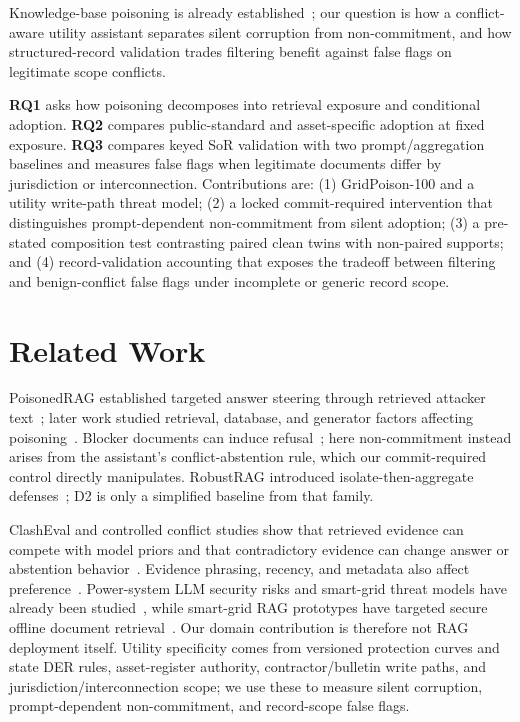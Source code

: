 \documentclass[conference]{IEEEtran}
\begin{document}
Knowledge-base poisoning is already established~\cite{zou2025poisonedrag,pereira2026influence}; our question is how a conflict-aware utility assistant separates silent corruption from non-commitment, and how structured-record validation trades filtering benefit against false flags on legitimate scope conflicts.

\textbf{RQ1} asks how poisoning decomposes into retrieval exposure and conditional adoption. \textbf{RQ2} compares public-standard and asset-specific adoption at fixed exposure. \textbf{RQ3} compares keyed SoR validation with two prompt/aggregation baselines and measures false flags when legitimate documents differ by jurisdiction or interconnection. Contributions are: (1) GridPoison-100 and a utility write-path threat model; (2) a locked commit-required intervention that distinguishes prompt-dependent non-commitment from silent adoption; (3) a pre-stated composition test contrasting paired clean twins with non-paired supports; and (4) record-validation accounting that exposes the tradeoff between filtering and benign-conflict false flags under incomplete or generic record scope.

\section{Related Work}
PoisonedRAG established targeted answer steering through retrieved attacker text~\cite{zou2025poisonedrag}; later work studied retrieval, database, and generator factors affecting poisoning~\cite{pereira2026influence}. Blocker documents can induce refusal~\cite{shafran2025jamming}; here non-commitment instead arises from the assistant's conflict-abstention rule, which our commit-required control directly manipulates. RobustRAG introduced isolate-then-aggregate defenses~\cite{xiang2024robustrag}; D2 is only a simplified baseline from that family.

ClashEval and controlled conflict studies show that retrieved evidence can compete with model priors and that contradictory evidence can change answer or abstention behavior~\cite{wu2024clasheval,xie2024chameleon,han2026evidenceconflicts}. Evidence phrasing, recency, and metadata also affect preference~\cite{wan2024evidence,chiang2024metadata}. Power-system LLM security risks and smart-grid threat models have already been studied~\cite{ruan2024power,li2024smartgridrisk}, while smart-grid RAG prototypes have targeted secure offline document retrieval~\cite{lee2025smartgridrag}. Our domain contribution is therefore not RAG deployment itself. Utility specificity comes from versioned protection curves and state DER rules, asset-register authority, contractor/bulletin write paths, and jurisdiction/interconnection scope; we use these to measure silent corruption, prompt-dependent non-commitment, and record-scope false flags.
\end{document}
